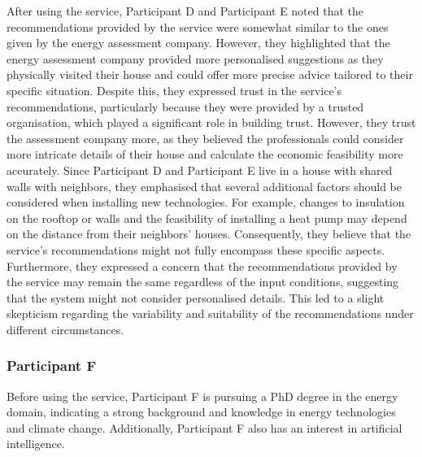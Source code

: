 After using the service, 
Participant D and Participant E noted that the recommendations provided by the service were somewhat similar to the ones given by the energy assessment company.
However, they highlighted that the energy assessment company provided more personalised suggestions as they physically visited their house and could offer more precise advice tailored to their specific situation. 
Despite this, they expressed trust in the service's recommendations, particularly because they were provided by a trusted organisation, which played a significant role in building trust.
However, they trust the assessment company more, as they believed the professionals could consider more intricate details of their house and calculate the economic feasibility more accurately. 
Since Participant D and Participant E live in a house with shared walls with neighbors, they emphasised that several additional factors should be considered when installing new technologies. 
For example, changes to insulation on the rooftop or walls and the feasibility of installing a heat pump may depend on the distance from their neighbors' houses. 
Consequently, they believe that the service's recommendations might not fully encompass these specific aspects. 
Furthermore, they expressed a concern that the recommendations provided by the service may remain the same regardless of the input conditions, suggesting that the system might not consider personalised details. 
This led to a slight skepticism regarding the variability and suitability of the recommendations under different circumstances.


\subsubsection{Participant F}

Before using the service, 
Participant F is pursuing a PhD degree in the energy domain, indicating a strong background and knowledge in energy technologies and climate change. 
Additionally, Participant F also has an interest in artificial intelligence.

